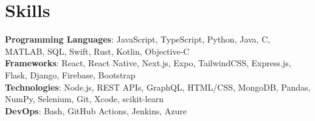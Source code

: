 

\section*{Skills}
	\textbf{Programming Languages}{: JavaScript, TypeScript, Python, Java, C, MATLAB, SQL, Swift, Rust, Kotlin, Objective-C} \\
	\textbf{Frameworks}{: React, React Native, Next.js, Expo, TailwindCSS, Express.js, Flask, Django, Firebase, Bootstrap} \\
	\textbf{Technologies}{: Node.js, REST APIs, GraphQL,  HTML/CSS, MongoDB, Pandas, NumPy, Selenium, Git, Xcode, scikit-learn} \\
	\textbf{DevOps}{: Bash, GitHub Actions, Jenkins, Azure} \\
\vspace{-6.5pt}
